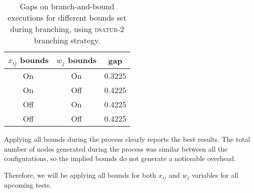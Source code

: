\begin{table}[h]
\centering

\begin{tabular}{|c|c|c|}
\hline
$x_{ij}$ bounds & $w_j$ bounds & gap \\
\hline
On & On & 0.3225 \\
On & Off & 0.4225 \\
Off & On & 0.4225 \\
Off & Off & 0.4225 \\
\hline
\end{tabular}

\caption{Gaps on branch-and-bound executions for different bounds set during branching, using \textsc{dsatur-2} branching strategy.}
\label{table:branch:bounds}

\end{table}	

Applying all bounds during the process clearly reports the best results. The total number of nodes generated during the process was similar between all the configurations, so the implied bounds do not generate a noticeable overhead. 

Therefore, we will be applying all bounds for both $x_{ij}$ and $w_j$ variables for all upcoming tests.
